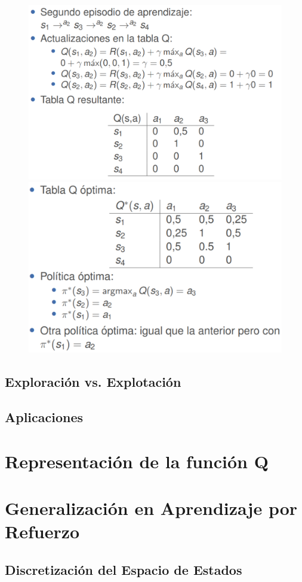 \documentclass[12pt]{report} %
\begin{document}
\begin{figure}[H]
  {\includegraphics[scale=.2]{2021-04-16 13_07_03-refuerzo.pdf - Foxit Reader.png}
  \includegraphics[scale=.2]{2021-04-16 13_07_51-refuerzo.pdf - Foxit Reader.png}}
\end{figure}

\subsection{Exploración vs. Explotación}

\subsection{Aplicaciones}

\section{Representación de la función Q}

\section{Generalización en Aprendizaje por Refuerzo}
\subsection{Discretización del Espacio de Estados}
\end{document}
